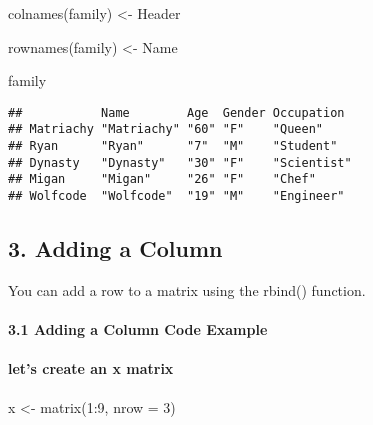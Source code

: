 \documentclass[
]{article}
\newenvironment{Shaded}{\begin{snugshade}}{\end{snugshade}}
\newcommand{\AttributeTok}[1]{\textcolor[rgb]{0.77,0.63,0.00}{#1}}
\newcommand{\DecValTok}[1]{\textcolor[rgb]{0.00,0.00,0.81}{#1}}
\newcommand{\FunctionTok}[1]{\textcolor[rgb]{0.00,0.00,0.00}{#1}}
\newcommand{\NormalTok}[1]{#1}
\newcommand{\OtherTok}[1]{\textcolor[rgb]{0.56,0.35,0.01}{#1}}
\newcommand{\SpecialCharTok}[1]{\textcolor[rgb]{0.00,0.00,0.00}{#1}}
\begin{document}
\begin{Shaded}
\begin{Highlighting}[]
\FunctionTok{colnames}\NormalTok{(family) }\OtherTok{\textless{}{-}}\NormalTok{ Header}
\end{Highlighting}
\end{Shaded}

\begin{Shaded}
\begin{Highlighting}[]
\FunctionTok{rownames}\NormalTok{(family) }\OtherTok{\textless{}{-}}\NormalTok{ Name}
\end{Highlighting}
\end{Shaded}

\begin{Shaded}
\begin{Highlighting}[]
\NormalTok{family}
\end{Highlighting}
\end{Shaded}

\begin{verbatim}
##           Name        Age  Gender Occupation 
## Matriachy "Matriachy" "60" "F"    "Queen"    
## Ryan      "Ryan"      "7"  "M"    "Student"  
## Dynasty   "Dynasty"   "30" "F"    "Scientist"
## Migan     "Migan"     "26" "F"    "Chef"     
## Wolfcode  "Wolfcode"  "19" "M"    "Engineer"
\end{verbatim}

\hypertarget{adding-a-column}{%
\subsection{3. Adding a Column}\label{adding-a-column}}

You can add a row to a matrix using the rbind() function.

\hypertarget{adding-a-column-code-example}{%
\paragraph{3.1 Adding a Column Code
Example}\label{adding-a-column-code-example}}

\hypertarget{lets-create-an-x-matrix}{%
\paragraph{let's create an x matrix}\label{lets-create-an-x-matrix}}

\begin{Shaded}
\begin{Highlighting}[]
\NormalTok{x }\OtherTok{\textless{}{-}} \FunctionTok{matrix}\NormalTok{(}\DecValTok{1}\SpecialCharTok{:}\DecValTok{9}\NormalTok{, }\AttributeTok{nrow =} \DecValTok{3}\NormalTok{)}
\end{Highlighting}
\end{Shaded}
\end{document}
